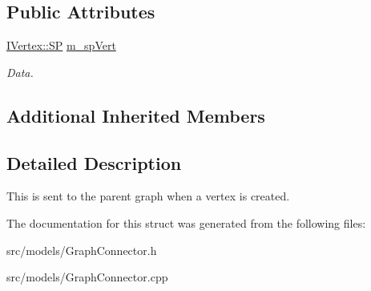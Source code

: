 \subsection*{Public Attributes}
\begin{DoxyCompactItemize}
\item 
\mbox{\label{struct_graph_connector_1_1_create_vert_event_a4ff17f8d2d72e9d853b8ab104314b207}} 
\hyperlink{class_i_graph_1_1_i_vertex_af72b9df91f110bc7824c608c10cc819c}{I\+Vertex\+::\+SP} \hyperlink{struct_graph_connector_1_1_create_vert_event_a4ff17f8d2d72e9d853b8ab104314b207}{m\+\_\+sp\+Vert}
\begin{DoxyCompactList}\small\item\em Data. \end{DoxyCompactList}\end{DoxyCompactItemize}
\subsection*{Additional Inherited Members}


\subsection{Detailed Description}
This is sent to the parent graph when a vertex is created. 

The documentation for this struct was generated from the following files\+:\begin{DoxyCompactItemize}
\item 
src/models/Graph\+Connector.\+h\item 
src/models/Graph\+Connector.\+cpp\end{DoxyCompactItemize}
